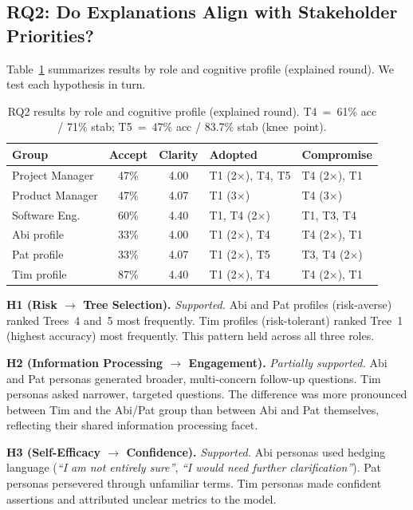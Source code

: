 \documentclass[sigconf,review]{acmart}
\begin{document}
\subsection{RQ2: Do Explanations Align with Stakeholder Priorities?}

Table~\ref{tab:rq2} summarizes results by role and cognitive profile
(explained round). We test each hypothesis in turn.

\begin{table}[ht]
  \caption{RQ2 results by role and cognitive profile (explained round).
           T4~=~61\% acc / 71\% stab;
           T5~=~47\% acc / 83.7\% stab (knee~point).}
  \label{tab:rq2}
  \small
  \begin{tabular}{lccll}
    \toprule
    \textbf{Group}
      & \textbf{Accept}
      & \textbf{Clarity}
      & \textbf{Adopted}
      & \textbf{Compromise} \\
    \midrule
    Project Manager & 47\% & 4.00 & T1 (2$\times$), T4, T5  & T4 (2$\times$), T1 \\
    Product Manager & 47\% & 4.07 & T1 (3$\times$)           & T4 (3$\times$) \\
    Software Eng.   & 60\% & 4.40 & T1, T4 (2$\times$)       & T1, T3, T4 \\
    \midrule
    Abi profile     & 33\% & 4.00 & T1 (2$\times$), T4       & T4 (2$\times$), T1 \\
    Pat profile     & 33\% & 4.07 & T1 (2$\times$), T5       & T3, T4 (2$\times$) \\
    Tim profile     & 87\% & 4.40 & T1 (2$\times$), T4       & T4 (2$\times$), T1 \\
    \bottomrule
  \end{tabular}
\end{table}

\textbf{H1 (Risk $\rightarrow$ Tree Selection).} \textit{Supported.}
Abi and Pat profiles (risk-averse) ranked Trees~4 and~5 most frequently.
Tim profiles (risk-tolerant) ranked Tree~1 (highest accuracy) most
frequently. This pattern held across all three roles.

\textbf{H2 (Information Processing $\rightarrow$ Engagement).}
\textit{Partially supported.} Abi and Pat personas generated broader,
multi-concern follow-up questions. Tim personas asked narrower, targeted
questions. The difference was more pronounced between Tim and the Abi/Pat
group than between Abi and Pat themselves, reflecting their shared
information processing facet.

\textbf{H3 (Self-Efficacy $\rightarrow$ Confidence).}
\textit{Supported.} Abi personas used hedging language (\textit{``I am
not entirely sure''}, \textit{``I would need further clarification''}).
Pat personas persevered through unfamiliar terms. Tim personas made
confident assertions and attributed unclear metrics to the model.
\end{document}
